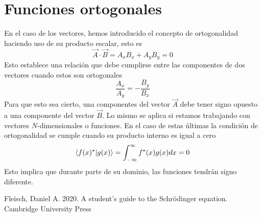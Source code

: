 \documentclass{tufte-handout}
\begin{document}
\section{Funciones ortogonales}
En el caso de los vectores, hemos introducido
el concepto de ortogonalidad haciendo uso de
su producto escalar, esto es
\begin{equation}
    \vec{A}\cdot\vec{B}=A_xB_x + A_yB_y=0
\end{equation}
Esto establece una relación que debe cumplirse
entre las componentes de dos vectores cuando
estos son ortogonales
\begin{equation}
    \frac{A_x}{A_y}=-\frac{B_y}{B_x}
\end{equation}
Para que esto sea cierto, una componentes del vector $\vec{A}$ debe tener signo opuesto a una componente del vector $\vec{B}$. Lo mismo
se aplica si estamos trabajando con vectores
$N$-dimensionales o funciones. En el caso
de estas últimas la condición de ortogonalidad se
cumple cuando su producto interno es igual a
cero
\begin{equation}
    \braket{f(x)^\star}{g(x)}=\int_{-\infty}^\infty f^\star(x)g(x)dx=0
\end{equation}
Esto implica que durante parte de su dominio,
las funciones tendrán signo diferente.



\begin{thebibliography}{}
Fleisch, Daniel A. 2020. A student's guide to the Schr{\"o}dinger equation. {Cambridge University Press}

\end{thebibliography}
\end{document}
